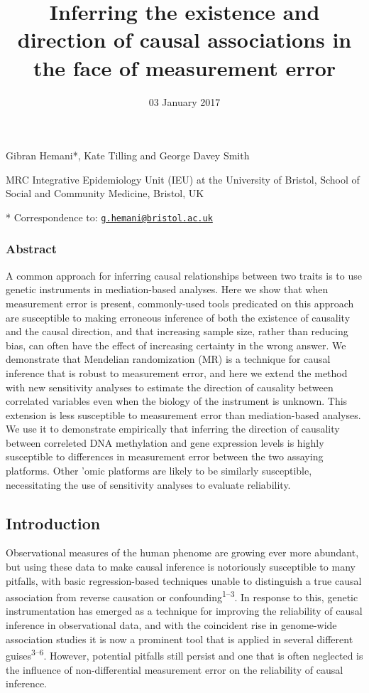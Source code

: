 \documentclass[]{article}
\title{Inferring the existence and direction of causal associations in the face
of measurement error}
\author{}
\date{03 January 2017}
\begin{document}
\maketitle

Gibran Hemani*, Kate Tilling and George Davey Smith

MRC Integrative Epidemiology Unit (IEU) at the University of Bristol,
School of Social and Community Medicine, Bristol, UK

* Correspondence to:
\href{mailto:g.hemani@bristol.ac.uk}{\nolinkurl{g.hemani@bristol.ac.uk}}

\subsubsection{Abstract}\label{abstract}

A common approach for inferring causal relationships between two traits
is to use genetic instruments in mediation-based analyses. Here we show
that when measurement error is present, commonly-used tools predicated
on this approach are susceptible to making erroneous inference of both
the existence of causality and the causal direction, and that increasing
sample size, rather than reducing bias, can often have the effect of
increasing certainty in the wrong answer. We demonstrate that Mendelian
randomization (MR) is a technique for causal inference that is robust to
measurement error, and here we extend the method with new sensitivity
analyses to estimate the direction of causality between correlated
variables even when the biology of the instrument is unknown. This
extension is less susceptible to measurement error than mediation-based
analyses. We use it to demonstrate empirically that inferring the
direction of causality between correleted DNA methylation and gene
expression levels is highly susceptible to differences in measurement
error between the two assaying platforms. Other 'omic platforms are
likely to be similarly susceptible, necessitating the use of sensitivity
analyses to evaluate reliability.

\subsection{Introduction}\label{introduction}

Observational measures of the human phenome are growing ever more
abundant, but using these data to make causal inference is notoriously
susceptible to many pitfalls, with basic regression-based techniques
unable to distinguish a true causal association from reverse causation
or confounding\textsuperscript{1--3}. In response to this, genetic
instrumentation has emerged as a technique for improving the reliability
of causal inference in observational data, and with the coincident rise
in genome-wide association studies it is now a prominent tool that is
applied in several different guises\textsuperscript{3--6}. However,
potential pitfalls still persist and one that is often neglected is the
influence of non-differential measurement error on the reliability of
causal inference.
\end{document}
